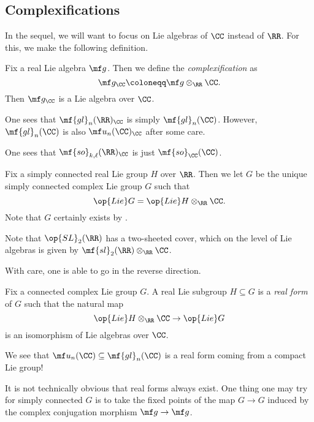 \documentclass[../notes.tex]{subfiles}
\begin{document}
\subsection{Complexifications}
In the sequel, we will want to focus on Lie algebras of $\CC$ instead of $\RR$. For this, we make the following definition.
\begin{definition}[complexification]
	Fix a real Lie algebra $\mf g$. Then we define the \textit{complexification} as
	\[\mf g_\CC\coloneqq\mf g\otimes_\RR\CC.\]
	Then $\mf g_\CC$ is a Lie algebra over $\CC$.
\end{definition}
\begin{example}
	One sees that $\mf{gl}_n(\RR)_\CC$ is simply $\mf{gl}_n(\CC)$. However, $\mf{gl}_n(\CC)$ is also $\mf u_n(\CC)_\CC$ after some care.
\end{example}
\begin{example}
	One sees that $\mf{so}_{k,\ell}(\RR)_\CC$ is just $\mf{so}_\CC(\CC)$.
\end{example}
\begin{definition}[complexification]
	Fix a simply connected real Lie group $H$ over $\RR$. Then we let $G$ be the unique simply connected complex Lie group $G$ such that
	\[\op{Lie}G=\op{Lie}H\otimes_\RR\CC.\]
	Note that $G$ certainly exists by .
\end{definition}
\begin{example}
	Note that $\op{SL}_2(\RR)$ has a two-sheeted cover, which on the level of Lie algebras is given by $\mf{sl}_2(\RR)\otimes_\RR\CC$. 
\end{example}
With care, one is able to go in the reverse direction.
\begin{definition}
	Fix a connected complex Lie group $G$. A real Lie subgroup $H\subseteq G$ is a \textit{real form} of $G$ such that the natural map
	\[\op{Lie}H\otimes_\RR\CC\to\op{Lie}G\]
	is an isomorphism of Lie algebras over $\CC$.
\end{definition}
\begin{example}
	We see that $\mf u_n(\CC)\subseteq\mf{gl}_n(\CC)$ is a real form coming from a compact Lie group!
\end{example}
\begin{remark}
	It is not technically obvious that real forms always exist. One thing one may try for simply connected $G$ is to take the fixed points of the map $G\to G$ induced by the complex conjugation morphism $\mf g\to\mf g$.
\end{remark}
\end{document}
